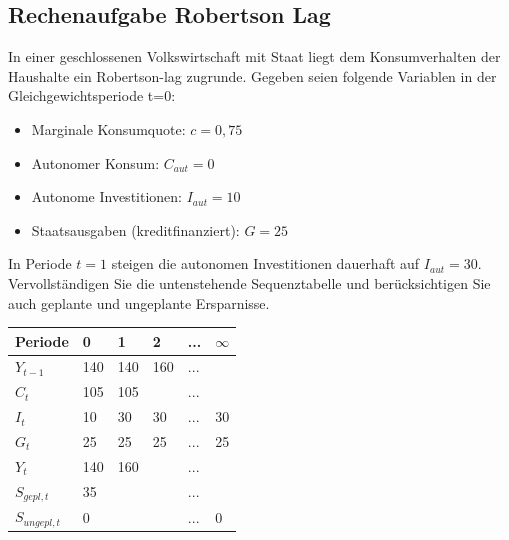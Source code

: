 \documentclass{scrartcl}
\begin{document}
\subsection{Rechenaufgabe Robertson Lag}
In einer geschlossenen Volkswirtschaft mit Staat liegt dem Konsumverhalten der Haushalte ein Robertson-lag zugrunde. Gegeben seien folgende Variablen in der Gleichgewichtsperiode t=0:
\begin{itemize}
	\item Marginale Konsumquote: $c = 0,75$
	\item Autonomer Konsum: $C_{aut} = 0$
	\item Autonome Investitionen: $I_{aut} = 10$
	\item Staatsausgaben (kreditfinanziert): $G = 25$
\end{itemize}
In Periode $t=1$ steigen die autonomen Investitionen dauerhaft auf $I_{aut} = 30$. Vervollständigen Sie die untenstehende Sequenztabelle und berücksichtigen Sie auch geplante und ungeplante Ersparnisse.\\
\begin{center}
	\begin{tabular}{|l|l|l|l|l|l|}
		\hline
		Periode      & 0   & 1   & 2   & ... & $\infty$ \\ \hline
		$Y_{t-1}$    & 140 & 140 & 160 & ... &          \\ \hline
		$C_t$          & 105 & 105 &     & ... &          \\ \hline
		$I_{t}$    & 10  & 30  & 30  & ... & 30       \\ \hline
		$G_t$          & 25  & 25  & 25  & ... & 25       \\ \hline
		$Y_t$        & 140 & 160 &     & ... &          \\ \hline
		$S_{gepl,t}$   & 35  &     &     & ... &          \\ \hline
		$S_{ungepl,t}$ & 0   &     &     & ... & 0        \\ \hline
	\end{tabular}
\end{center}
\end{document}
